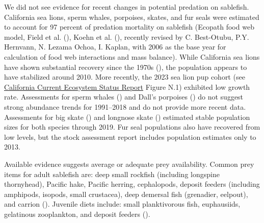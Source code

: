 \documentclass[
  english,
]{article}
\begin{document}
We did not see evidence for recent changes in potential predation on
sablefish. California sea lions, sperm whales, porpoises, skates, and
fur seals were estimated to account for 97 percent of predation
mortality on sablefish (Ecopath food web model, Field et al.
(), Koehn et al.
(), recently revised by C.
Best-Otubu, P.Y. Hernvann, N. Lezama Ochoa, I. Kaplan, with 2006 as the
base year for calculation of food web interactions and mass balance).
While California sea lions have shown substantial recovery since the
1970s (), the
population appears to have stabilized around 2010. More recently, the
2023 sea lion pup cohort (see
\href{https://www.pcouncil.org/documents/2025/02/f-1-a-cciea-report-1-2024-2025-california-current-ecosystem-status-report.pdf/}{California
Current Ecosystem Status Report} Figure N.1) exhibited low growth rate.
Assessments for sperm whales () and Dall's porpoises () do not suggest strong abundance trends for 1991--2018 and
do not provide more recent data. Assessments for big skate
() and longnose skate
() estimated
stable population sizes for both species through 2019. Fur seal
populations also have recovered from low levels, but the stock
assessment report includes population estimates only to 2013.

Available evidence suggests average or adequate prey availability.
Common prey items for adult sablefish are: deep small rockfish
(including longspine thornyhead), Pacific hake, Pacific herring,
cephalopods, deposit feeders (including amphipods, isopods, small
crustacea), deep demersal fish (grenadier, eelpout), and carrion
(). Juvenile diets include:
small planktivorous fish, euphausiids, gelatinous zooplankton, and
deposit feeders ().
\end{document}
